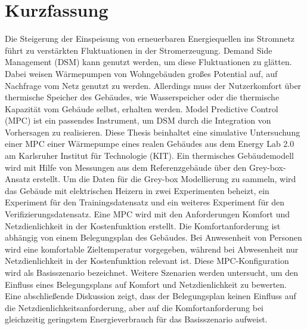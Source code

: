 \chapter{Kurzfassung}
\label{ch:kurzfassung}
Die Steigerung der Einspeisung von erneuerbaren Energiequellen ins Stromnetz führt zu verstärkten Fluktuationen in der Stromerzeugung. Demand Side Management (DSM) kann genutzt werden, um diese Fluktuationen zu glätten. Dabei weisen Wärmepumpen von Wohngebäuden großes Potential auf, auf Nachfrage vom Netz genutzt zu werden. Allerdings muss der Nutzerkomfort über thermische Speicher des Gebäudes, wie Wasserspeicher oder die thermische Kapazität vom Gebäude selbst, erhalten werden. Model Predictive Control (MPC) ist ein passendes Instrument, um DSM durch die Integration von Vorhersagen zu realisieren.\newline 
Diese Thesis beinhaltet eine simulative Untersuchung einer MPC einer Wärmepumpe eines realen Gebäudes aus dem Energy Lab 2.0 am Karlsruher Institut für Technologie (KIT). Ein thermisches Gebäudemodell wird mit Hilfe von Messungen aus dem Referenzgebäude über den Grey-box- Ansatz erstellt. Um die Daten für die Grey-box Modellierung zu sammeln, wird das Gebäude mit elektrischen Heizern in zwei Experimenten beheizt, ein Experiment für den Trainingsdatensatz und ein weiteres Experiment für den Verifizierungsdatensatz.\newline
Eine MPC wird mit den Anforderungen Komfort und Netzdienlichkeit in der Kostenfunktion erstellt. Die Komfortanforderung ist abhängig von einem Belegungsplan des Gebäudes. Bei Anwesenheit von Personen wird eine komfortable Zieltemperatur vorgegeben, während bei Abwesenheit nur Netzdienlichkeit in der Kostenfunktion relevant ist. Diese MPC-Konfiguration wird als Basisszenario bezeichnet.  Weitere Szenarien werden untersucht, um den Einfluss eines Belegungsplans auf Komfort und Netzdienlichkeit zu bewerten. Eine abschließende Diskussion zeigt, dass der Belegungsplan keinen Einfluss auf die Netzdienlichkeitsanforderung, aber auf die Komfortanforderung bei gleichzeitig geringstem Energieverbrauch für das Basisszenario aufweist.



